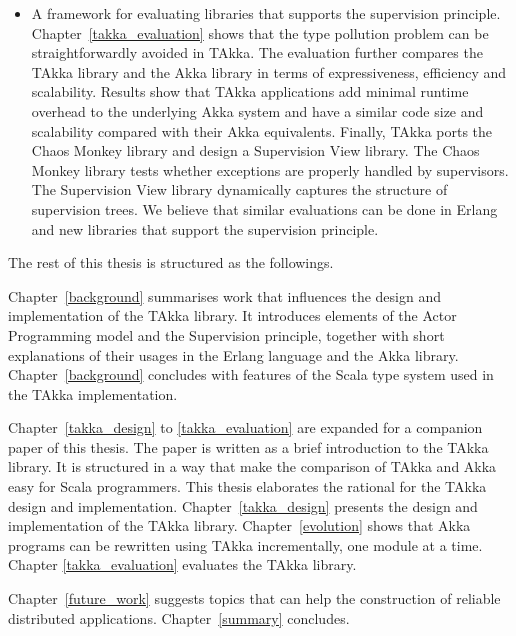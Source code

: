 \begin{itemize}
  
  \item A framework for evaluating libraries that supports the supervision 
  principle. Chapter~\ref{takka_evaluation} shows that the type pollution 
  problem can be straightforwardly avoided in TAkka.  The evaluation further 
  compares the TAkka library and the Akka library in terms of expressiveness, efficiency and 
  scalability. Results show that TAkka applications add minimal runtime overhead 
  to the underlying Akka system and have a similar code size and scalability 
  compared with their Akka equivalents. Finally, TAkka ports the Chaos Monkey 
  library and design a Supervision View library.  The Chaos Monkey library tests whether 
  exceptions are properly handled by supervisors.  The Supervision View library 
  dynamically captures the structure of supervision trees. We believe that similar 
  evaluations can be done in Erlang and new libraries that support the supervision 
  principle.
\begin{comment}  
  \item A model for analyzing the reliability and availability of 
  fault-tolerant systems that use the {\it reactive} mechanism (supervision) 
  and the {\it proactive} mechanism (software rejuvenation).  The novel model 
  (Chapter~\ref{rejuvenation_model}) overcomes the limitation of the classic 
  software rejuvenation model where the failure rate is treated as a constant
  and failure recovery is ironically treated as a stochastic process.  
  \mycomment{add new contributions once achieved}
  \mycomment{efficient approximate estimation}
  \mycomment{? the classic model is the least accurate approximation. ?}  
\end{comment}  
\end{itemize}


The rest of this thesis is structured as the followings.

Chapter~\ref{background} summarises work that influences the design and implementation
of the TAkka library.  It introduces elements of the Actor Programming model and the 
Supervision principle, together with short explanations of their usages in the Erlang 
language and the Akka library.  Chapter~\ref{background} concludes with features of the
Scala type system used in the TAkka implementation.   

Chapter~\ref{takka_design} to \ref{takka_evaluation}
are expanded for a companion paper of this thesis.  The paper \citep{TAKKA_paper} 
is written as a brief introduction to the TAkka library.  It
is structured in a way that make the comparison of TAkka and Akka easy for Scala programmers.
This thesis elaborates the rational for the TAkka design and implementation.   
Chapter~\ref{takka_design} presents the design and implementation of the TAkka library. 
Chapter~\ref{evolution} shows that Akka programs can be rewritten using TAkka incrementally, 
one module at a time.
Chapter \ref{takka_evaluation} evaluates the TAkka library.

Chapter~\ref{future_work} suggests topics that can help the construction of reliable
distributed applications.  Chapter~\ref{summary} concludes.

